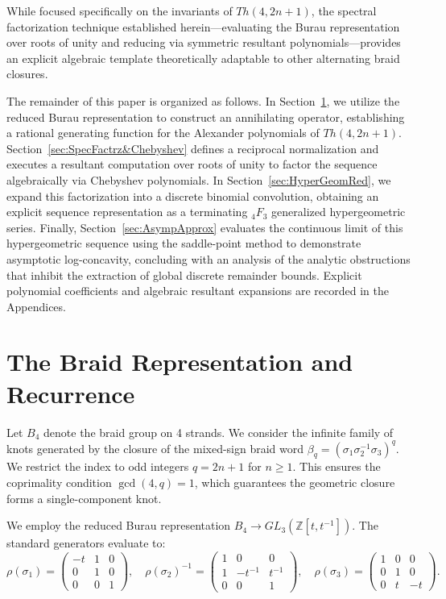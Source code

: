 \documentclass[11pt]{article}
\begin{document}
While focused specifically on the invariants of $Th(4,2n+1)$, the spectral factorization technique established herein—evaluating the Burau representation over roots of unity and reducing via symmetric resultant polynomials—provides an explicit algebraic template theoretically adaptable to other alternating braid closures.

The remainder of this paper is organized as follows. In Section~\ref{sec:BraidRepr&Recurr}, we utilize the reduced Burau representation to construct an annihilating operator, establishing a rational generating function for the Alexander polynomials of $Th(4, 2n+1)$. Section~\ref{sec:SpecFactrz&Chebyshev} defines a reciprocal normalization and executes a resultant computation over roots of unity to factor the sequence algebraically via Chebyshev polynomials. In Section~\ref{sec:HyperGeomRed}, we expand this factorization into a discrete binomial convolution, obtaining an explicit sequence representation as a terminating ${}_4F_3$ generalized hypergeometric series. Finally, Section~\ref{sec:AsympApprox} evaluates the continuous limit of this hypergeometric sequence using the saddle-point method to demonstrate asymptotic log-concavity, concluding with an analysis of the analytic obstructions that inhibit the extraction of global discrete remainder bounds. Explicit polynomial coefficients and algebraic resultant expansions are recorded in the Appendices.

\section{The Braid Representation and Recurrence} \label{sec:BraidRepr&Recurr}

Let $B_4$ denote the braid group on 4 strands. We consider the infinite family of knots generated by the closure of the mixed-sign braid word $\beta_q = (\sigma_1\sigma_2^{-1}\sigma_3)^q$. We restrict the index to odd integers $q = 2n+1$ for $n \ge 1$. This ensures the coprimality condition $\gcd(4, q) = 1$, which guarantees the geometric closure forms a single-component knot. 

We employ the reduced Burau representation $B_4 \to GL_3(\mathbb{Z}[t, t^{-1}])$. The standard generators evaluate to:
\begin{equation*}
\rho(\sigma_1) = \begin{pmatrix} -t & 1 & 0 \\ 0 & 1 & 0 \\ 0 & 0 & 1 \end{pmatrix}, \quad
\rho(\sigma_2)^{-1} = \begin{pmatrix} 1 & 0 & 0 \\ 1 & -t^{-1} & t^{-1} \\ 0 & 0 & 1 \end{pmatrix}, \quad
\rho(\sigma_3) = \begin{pmatrix} 1 & 0 & 0 \\ 0 & 1 & 0 \\ 0 & t & -t \end{pmatrix}.
\end{equation*}
\end{document}
